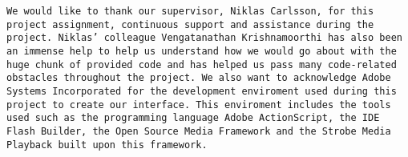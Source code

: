 \texttt{We would like to thank our supervisor, Niklas Carlsson, for this project assignment, continuous support and assistance during the project. Niklas’ colleague Vengatanathan Krishnamoorthi has also been an immense help to help us understand how we would go about with the huge chunk of provided code and has helped us pass many code-related obstacles throughout the project. 
We also want to acknowledge Adobe Systems Incorporated for the development enviroment used during this project to create our interface. This enviroment includes the tools used such as the programming language Adobe ActionScript, the IDE Flash Builder, the Open Source Media Framework and the Strobe Media Playback built upon this framework.}